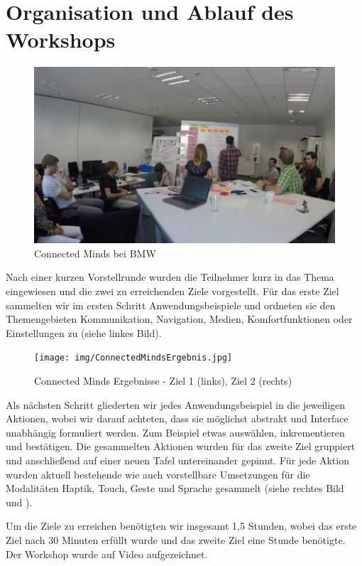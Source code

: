 \section[Ablauf]{Organisation und Ablauf des Workshops}
\begin{figure}[ht]
  \centering
  \includegraphics[width=1\textwidth]{img/ConnectedMind.jpg}
  \caption{Connected Minds bei BMW}
  \label{fig:ConnectedMind}
\end{figure} 
Nach einer kurzen Vorstellrunde wurden die Teilnehmer kurz in das Thema eingewiesen und die zwei zu erreichenden Ziele vorgestellt. 
Für das erste Ziel sammelten wir im ersten Schritt Anwendungsbeispiele und ordneten sie den Themengebieten Kommunikation, Navigation, Medien, Komfortfunktionen oder Einstellungen zu (siehe  linkes Bild).
\begin{figure}[ht]
  \centering
  \texttt{[image: img/ConnectedMindsErgebnis.jpg]}
  \caption[Connected Minds Ergebnisse]{Connected Minds Ergebnisse - Ziel 1 (links), Ziel 2 (rechts)}
  \label{fig:ConnectedMindErgebnisse}
\end{figure}  

Als nächsten Schritt gliederten wir jedes Anwendungsbeispiel in die jeweiligen Aktionen, wobei wir darauf achteten, dass sie möglichst abstrakt und Interface unabhängig formuliert werden. 
Zum Beispiel etwas auswählen, inkrementieren und bestätigen. 
Die gesammelten Aktionen wurden für das zweite Ziel gruppiert und anschließend auf einer neuen Tafel untereinander gepinnt. 
Für jede Aktion wurden aktuell bestehende wie auch vorstellbare Umsetzungen für die Modalitäten Haptik, Touch, Geste und Sprache gesammelt (siehe  rechtes Bild und ). 

Um die Ziele zu erreichen benötigten wir insgesamt 1,5 Stunden, wobei das erste Ziel nach 30 Minuten erfüllt wurde und das zweite Ziel eine Stunde benötigte. 
Der Workshop wurde auf Video aufgezeichnet.
